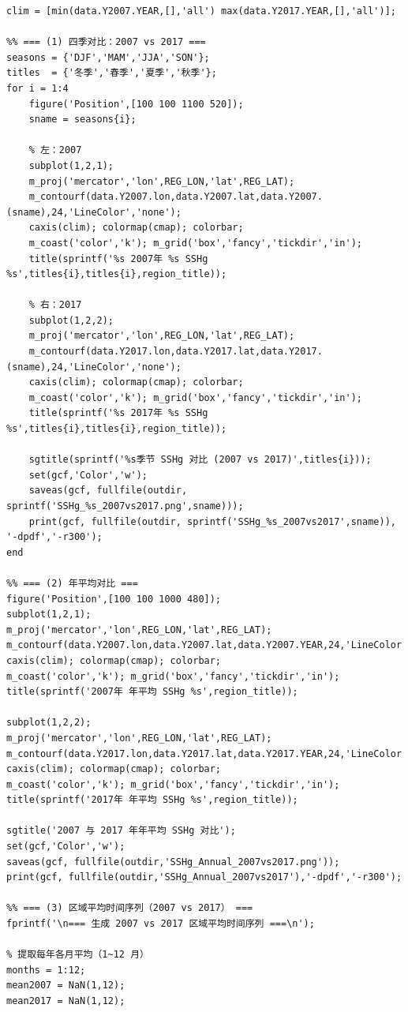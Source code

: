 \documentclass[UTF8]{article}
\begin{document}
\begin{verbatim}
clim = [min(data.Y2007.YEAR,[],'all') max(data.Y2017.YEAR,[],'all')];

%% === (1) 四季对比：2007 vs 2017 ===
seasons = {'DJF','MAM','JJA','SON'};
titles  = {'冬季','春季','夏季','秋季'};
for i = 1:4
    figure('Position',[100 100 1100 520]);
    sname = seasons{i};

    % 左：2007
    subplot(1,2,1);
    m_proj('mercator','lon',REG_LON,'lat',REG_LAT);
    m_contourf(data.Y2007.lon,data.Y2007.lat,data.Y2007.(sname),24,'LineColor','none');
    caxis(clim); colormap(cmap); colorbar;
    m_coast('color','k'); m_grid('box','fancy','tickdir','in');
    title(sprintf('%s 2007年 %s SSHg %s',titles{i},titles{i},region_title));

    % 右：2017
    subplot(1,2,2);
    m_proj('mercator','lon',REG_LON,'lat',REG_LAT);
    m_contourf(data.Y2017.lon,data.Y2017.lat,data.Y2017.(sname),24,'LineColor','none');
    caxis(clim); colormap(cmap); colorbar;
    m_coast('color','k'); m_grid('box','fancy','tickdir','in');
    title(sprintf('%s 2017年 %s SSHg %s',titles{i},titles{i},region_title));

    sgtitle(sprintf('%s季节 SSHg 对比 (2007 vs 2017)',titles{i}));
    set(gcf,'Color','w');
    saveas(gcf, fullfile(outdir, sprintf('SSHg_%s_2007vs2017.png',sname)));
    print(gcf, fullfile(outdir, sprintf('SSHg_%s_2007vs2017',sname)), '-dpdf','-r300');
end

%% === (2) 年平均对比 ===
figure('Position',[100 100 1000 480]);
subplot(1,2,1);
m_proj('mercator','lon',REG_LON,'lat',REG_LAT);
m_contourf(data.Y2007.lon,data.Y2007.lat,data.Y2007.YEAR,24,'LineColor','none');
caxis(clim); colormap(cmap); colorbar;
m_coast('color','k'); m_grid('box','fancy','tickdir','in');
title(sprintf('2007年 年平均 SSHg %s',region_title));

subplot(1,2,2);
m_proj('mercator','lon',REG_LON,'lat',REG_LAT);
m_contourf(data.Y2017.lon,data.Y2017.lat,data.Y2017.YEAR,24,'LineColor','none');
caxis(clim); colormap(cmap); colorbar;
m_coast('color','k'); m_grid('box','fancy','tickdir','in');
title(sprintf('2017年 年平均 SSHg %s',region_title));

sgtitle('2007 与 2017 年年平均 SSHg 对比');
set(gcf,'Color','w');
saveas(gcf, fullfile(outdir,'SSHg_Annual_2007vs2017.png'));
print(gcf, fullfile(outdir,'SSHg_Annual_2007vs2017'),'-dpdf','-r300');

%% === (3) 区域平均时间序列（2007 vs 2017） ===
fprintf('\n=== 生成 2007 vs 2017 区域平均时间序列 ===\n');

% 提取每年各月平均（1~12 月）
months = 1:12;
mean2007 = NaN(1,12);
mean2017 = NaN(1,12);


\end{verbatim}
\end{document}
